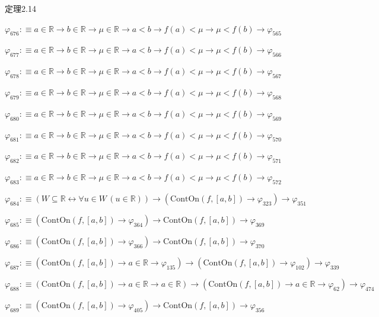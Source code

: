 \begin{fullproof}{定理2.14}
\begin{abbrevlist}
\item $\varphi_{676} :\equiv a \in \mathbb{R} \to b \in \mathbb{R} \to \mu \in \mathbb{R} \to a < b \to f(a) < \mu \to \mu < f(b) \to \varphi_{565}$
\item $\varphi_{677} :\equiv a \in \mathbb{R} \to b \in \mathbb{R} \to \mu \in \mathbb{R} \to a < b \to f(a) < \mu \to \mu < f(b) \to \varphi_{566}$
\item $\varphi_{678} :\equiv a \in \mathbb{R} \to b \in \mathbb{R} \to \mu \in \mathbb{R} \to a < b \to f(a) < \mu \to \mu < f(b) \to \varphi_{567}$
\item $\varphi_{679} :\equiv a \in \mathbb{R} \to b \in \mathbb{R} \to \mu \in \mathbb{R} \to a < b \to f(a) < \mu \to \mu < f(b) \to \varphi_{568}$
\item $\varphi_{680} :\equiv a \in \mathbb{R} \to b \in \mathbb{R} \to \mu \in \mathbb{R} \to a < b \to f(a) < \mu \to \mu < f(b) \to \varphi_{569}$
\item $\varphi_{681} :\equiv a \in \mathbb{R} \to b \in \mathbb{R} \to \mu \in \mathbb{R} \to a < b \to f(a) < \mu \to \mu < f(b) \to \varphi_{570}$
\item $\varphi_{682} :\equiv a \in \mathbb{R} \to b \in \mathbb{R} \to \mu \in \mathbb{R} \to a < b \to f(a) < \mu \to \mu < f(b) \to \varphi_{571}$
\item $\varphi_{683} :\equiv a \in \mathbb{R} \to b \in \mathbb{R} \to \mu \in \mathbb{R} \to a < b \to f(a) < \mu \to \mu < f(b) \to \varphi_{572}$
\item $\varphi_{684} :\equiv (W \subseteq \mathbb{R} \leftrightarrow \forall u \in W\,(u \in \mathbb{R})) \to (\mathrm{ContOn}(f,[a,b]) \to \varphi_{323}) \to \varphi_{351}$
\item $\varphi_{685} :\equiv (\mathrm{ContOn}(f,[a,b]) \to \varphi_{364}) \to \mathrm{ContOn}(f,[a,b]) \to \varphi_{369}$
\item $\varphi_{686} :\equiv (\mathrm{ContOn}(f,[a,b]) \to \varphi_{366}) \to \mathrm{ContOn}(f,[a,b]) \to \varphi_{370}$
\item $\varphi_{687} :\equiv (\mathrm{ContOn}(f,[a,b]) \to a \in \mathbb{R} \to \varphi_{135}) \to (\mathrm{ContOn}(f,[a,b]) \to \varphi_{102}) \to \varphi_{339}$
\item $\varphi_{688} :\equiv (\mathrm{ContOn}(f,[a,b]) \to a \in \mathbb{R} \to a \in \mathbb{R}) \to (\mathrm{ContOn}(f,[a,b]) \to a \in \mathbb{R} \to \varphi_{62}) \to \varphi_{474}$
\item $\varphi_{689} :\equiv (\mathrm{ContOn}(f,[a,b]) \to \varphi_{405}) \to \mathrm{ContOn}(f,[a,b]) \to \varphi_{356}$

\end{abbrevlist}
\end{fullproof}
